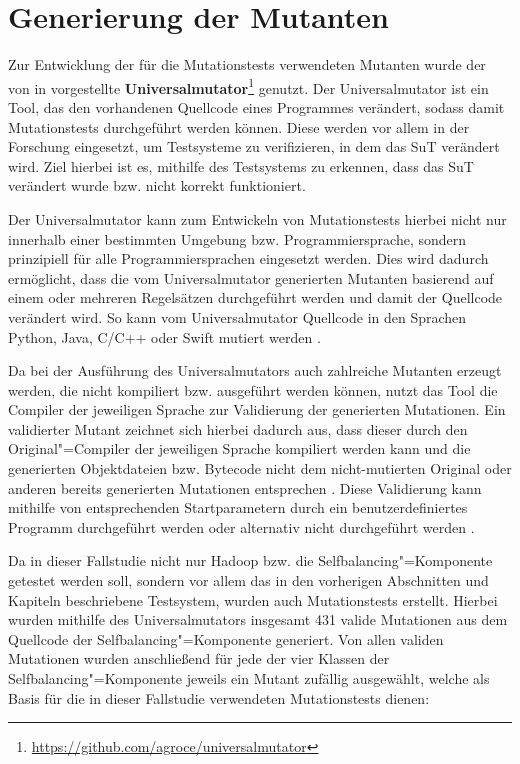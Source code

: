 \section{Generierung der Mutanten}
\label{sec:implMutationTests}

Zur Entwicklung der für die Mutationstests verwendeten Mutanten wurde der von \citeauthor{Groce2018} in \cite{Groce2018} vorgestellte \textbf{Universalmutator}\footnote{\url{https://github.com/agroce/universalmutator}} genutzt.
Der Universalmutator ist ein Tool, das den vorhandenen Quellcode eines Programmes verändert, sodass damit Mutationstests durchgeführt werden können.
Diese werden vor allem in der Forschung eingesetzt, um Testsysteme zu verifizieren, in dem das \ac{SuT} verändert wird.
Ziel hierbei ist es, mithilfe des Testsystems zu erkennen, dass das \ac{SuT} verändert wurde bzw. nicht korrekt funktioniert.

Der Universalmutator kann zum Entwickeln von Mutationstests hierbei nicht nur innerhalb einer bestimmten Umgebung bzw. Programmiersprache, sondern prinzipiell für alle Programmiersprachen eingesetzt werden.
Dies wird dadurch ermöglicht, dass die vom Universalmutator generierten Mutanten basierend auf einem oder mehreren Regelsätzen durchgeführt werden und damit der Quellcode verändert wird.
So kann vom Universalmutator Quellcode \uA in den Sprachen Python, Java, C/C++ oder Swift mutiert werden \cite{Groce2018}.

Da bei der Ausführung des Universalmutators auch zahlreiche Mutanten erzeugt werden, die nicht kompiliert bzw. ausgeführt werden können, nutzt das Tool die Compiler der jeweiligen Sprache zur Validierung der generierten Mutationen.
Ein validierter Mutant zeichnet sich hierbei dadurch aus, dass dieser durch den Original"=Compiler der jeweiligen Sprache kompiliert werden kann und die generierten Objektdateien bzw. Bytecode nicht dem nicht-mutierten Original oder anderen bereits generierten Mutationen entsprechen \cite{Groce2018}.
Diese Validierung kann mithilfe von entsprechenden Startparametern durch ein benutzerdefiniertes Programm durchgeführt werden oder alternativ nicht durchgeführt werden \cite{Groce2018,UniversalmutatorSourceGenmutants}.

Da in dieser Fallstudie nicht nur Hadoop bzw. die Selfbalancing"=Komponente getestet werden soll, sondern vor allem das in den vorherigen Abschnitten und Kapiteln beschriebene Testsystem, wurden auch Mutationstests erstellt.
Hierbei wurden mithilfe des Universalmutators insgesamt 431 valide Mutationen aus dem Quellcode der Selfbalancing"=Komponente generiert.
Von allen validen Mutationen wurden anschließend für jede der vier Klassen der Selfbalancing"=Komponente jeweils ein Mutant zufällig ausgewählt, welche als Basis für die in dieser Fallstudie verwendeten Mutationstests dienen:

